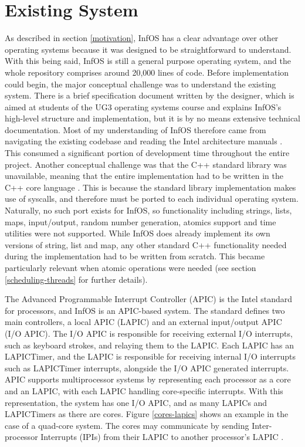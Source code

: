 \documentclass[bsc,frontabs,singlespacing,parskip,deptreport]{infthesis}
\begin{document}
\section{Existing System} \label{existing-system}
As described in section \ref{motivation}, InfOS has a clear advantage over other operating systems because it was designed to be straightforward to understand. With this being said, InfOS is still a general purpose operating system, and the whole repository comprises around 20,000 lines of code. Before implementation could begin, the major conceptual challenge was to understand the existing system. There is a brief specification document \cite{os-cw-spec} written by the designer, which is aimed at students of the UG3 operating systems course and explains InfOS’s high-level structure and implementation, but it is by no means extensive technical documentation. Most of my understanding of InfOS therefore came from navigating the existing codebase and reading the Intel architecture manuals \cite{intel-full-manual}. This consumed a significant portion of development time throughout the entire project. Another conceptual challenge was that the C++ standard library was unavailable, meaning that the entire implementation had to be written in the C++ core language \cite{cpp-core}. This is because the standard library implementation makes use of syscalls, and therefore must be ported to each individual operating system. Naturally, no such port exists for InfOS, so functionality including strings, lists, maps, input/output, random number generation, atomics support and time utilities were not supported. While InfOS does already implement its own versions of string, list and map, any other standard C++ functionality needed during the implementation had to be written from scratch. This became particularly relevant when atomic operations were needed (see section \ref{scheduling-threads} for further details).
 
The Advanced Programmable Interrupt Controller (APIC) \cite{intel-sys-prog-guide} is the Intel standard for processors, and InfOS is an APIC-based system. The standard defines two main controllers, a local APIC (LAPIC) and an external input/output APIC (I/O APIC). The I/O APIC is responsible for receiving external I/O interrupts, such as keyboard strokes, and relaying them to the LAPIC. Each LAPIC has an LAPICTimer, and the LAPIC is responsible for receiving internal I/O interrupts such as LAPICTimer interrupts, alongside the I/O APIC generated interrupts. APIC supports multiprocessor systems by representing each processor as a core and an LAPIC, with each LAPIC handling core-specific interrupts. With this representation, the system has one I/O APIC, and as many LAPICs and LAPICTimers as there are cores. Figure \ref{cores-lapics} shows an example in the case of a quad-core system. The cores may communicate by sending Inter-processor Interrupts (IPIs) from their LAPIC to another processor’s LAPIC \cite{intel-sys-prog-guide}. 
\end{document}
